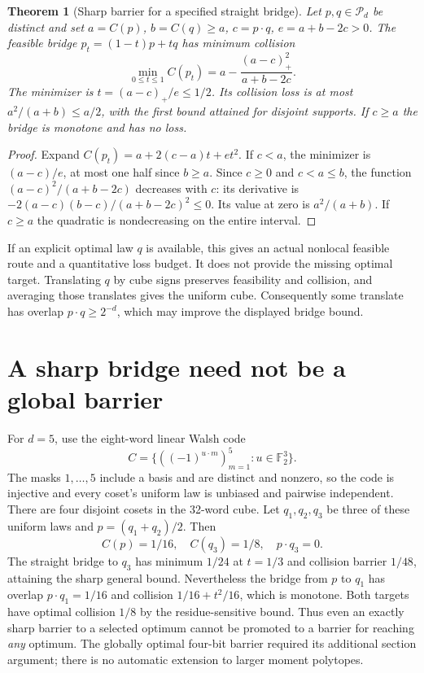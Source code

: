 \documentclass[11pt]{article}
\newtheorem{theorem}{Theorem}[section]
\begin{document}
\begin{theorem}[Sharp barrier for a specified straight bridge]
Let $p,q\in\mathcal P_d$ be distinct and set
$a=C(p)$, $b=C(q)\ge a$, $c=p\cdot q$, $e=a+b-2c>0$.
The feasible bridge $p_t=(1-t)p+tq$ has minimum collision
\[
 \min_{0\le t\le1}C(p_t)
 =a-\frac{(a-c)_+^2}{a+b-2c}.
\]
The minimizer is $t=(a-c)_+/e\le1/2$. Its collision loss is at most
$a^2/(a+b)\le a/2$, with the first bound attained for disjoint
supports. If $c\ge a$ the bridge is monotone and has no loss.
\end{theorem}
\begin{proof}
Expand $C(p_t)=a+2(c-a)t+et^2$. If $c<a$, the minimizer is
$(a-c)/e$, at most one half since $b\ge a$. Since $c\ge0$ and
$c<a\le b$, the function $(a-c)^2/(a+b-2c)$ decreases with $c$:
its derivative is $-2(a-c)(b-c)/(a+b-2c)^2\le0$.
Its value at zero is $a^2/(a+b)$. If $c\ge a$ the quadratic is
nondecreasing on the entire interval.
\end{proof}
If an explicit optimal law $q$ is available, this gives an actual
nonlocal feasible route and a quantitative loss budget. It does not
provide the missing optimal target. Translating $q$ by cube signs
preserves feasibility and collision, and averaging those translates
gives the uniform cube. Consequently some translate has overlap
$p\cdot q\ge2^{-d}$, which may improve the displayed bridge bound.

\section*{A sharp bridge need not be a global barrier}
For $d=5$, use the eight-word linear Walsh code
\[
 C=\{((-1)^{u\cdot m})_{m=1}^5:u\in\mathbb F_2^3\}.
\]
The masks $1,\ldots,5$ include a basis and are distinct and nonzero,
so the code is injective and every coset's uniform law is unbiased
and pairwise independent. There are four disjoint cosets in the
32-word cube. Let $q_1,q_2,q_3$ be three of these uniform laws and
$p=(q_1+q_2)/2$. Then
\[
 C(p)=1/16,\quad C(q_3)=1/8,\quad p\cdot q_3=0.
\]
The straight bridge to $q_3$ has minimum $1/24$ at $t=1/3$ and
collision barrier $1/48$, attaining the sharp general bound.
Nevertheless the bridge from $p$ to $q_1$ has overlap $p\cdot q_1=1/16$
and collision $1/16+t^2/16$, which is monotone. Both targets have
optimal collision $1/8$ by the residue-sensitive bound.
Thus even an exactly sharp barrier to a selected optimum cannot be
promoted to a barrier for reaching \emph{any} optimum. The globally
optimal four-bit barrier required its additional section argument;
there is no automatic extension to larger moment polytopes.
\end{document}

